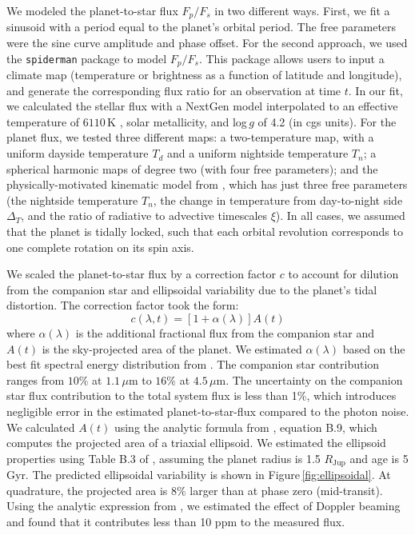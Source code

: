 \documentclass[twocolumn, trackchanges]{aastex61}
\begin{document}
We modeled the planet-to-star flux $F_p/F_s$ in two different ways. First, we fit a sinusoid with a period equal to the planet's orbital period. The free parameters were the sine curve amplitude and phase offset. For the second approach, we used the \texttt{spiderman} package \citep{louden17} to model $F_p/F_s$. This package allows users to input a climate map (temperature or brightness as a function of latitude and longitude), and generate the corresponding flux ratio for an observation at time $t$.  In our fit, we calculated the stellar flux with a NextGen model \citep{allard12} interpolated to an effective temperature of $6110\,\mathrm{K}$ \citep{gillon14}, solar metallicity, and log\,$g$ of 4.2 (in cgs units).  For the planet flux, we tested three different maps: a two-temperature map, with a uniform dayside temperature $T_d$ and a uniform nightside temperature $T_n$; a spherical harmonic maps of degree two (with four free parameters); and the physically-motivated kinematic model from \cite{zhang17}, which has just three free parameters (the nightside temperature $T_n$, the change in temperature from day-to-night side $\Delta_T$, and the ratio of radiative to advective timescales $\xi$).  In all cases, we assumed that the planet is tidally locked, such that each orbital revolution corresponds to one complete rotation on its spin axis. 

We scaled the planet-to-star flux by a correction factor $c$ to account for dilution from the companion star and ellipsoidal variability due to the planet's tidal distortion. The correction factor took the form: 
\begin{equation}
	c(\lambda, t) = [1 + \alpha(\lambda)]A(t)
\end{equation}
where $\alpha(\lambda)$ is the additional fractional flux from the companion star and $A(t)$ is the sky-projected area of the planet. We estimated $\alpha(\lambda)$ based on the best fit spectral energy distribution from \cite{cartier17}. The companion star contribution ranges from $10\%$ at $1.1\,\mu$m to $16\%$ at $4.5\,\mu$m. The uncertainty on the companion star flux contribution to the total system flux is less than 1\%, which introduces negligible error in the estimated planet-to-star-flux compared to the photon noise.   We calculated $A(t)$ using the analytic formula from \cite{leconte11b}, equation B.9, which computes the projected area of a triaxial ellipsoid. We estimated the ellipsoid properties using Table B.3 of \cite{leconte11a}, assuming the planet radius is 1.5 $R_\mathrm{Jup}$ and age is 5 Gyr. The predicted ellipsoidal variability is shown in Figure\,\ref{fig:ellipsoidal}. At quadrature, the projected area is $8\%$ larger than at phase zero (mid-transit). Using the analytic expression from \cite{loeb03}, we estimated the effect of Doppler beaming and found that it contributes less than 10 ppm to the measured flux. 
\end{document}
